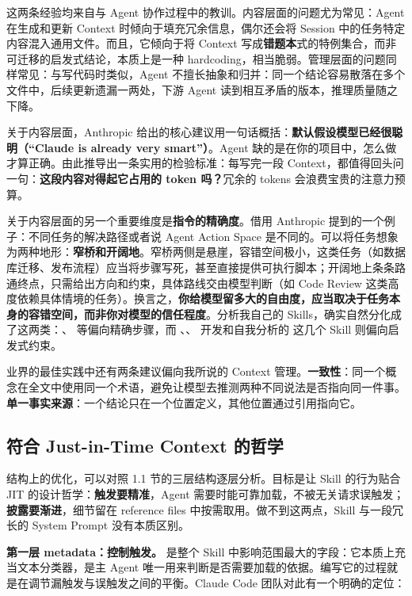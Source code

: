 这两条经验均来自与 Agent 协作过程中的教训。内容层面的问题尤为常见：Agent 在生成和更新 Context 时倾向于填充冗余信息，偶尔还会将 Session 中的任务特定内容混入通用文件。而且，它倾向于将 Context 写成\textbf{错题本}式的特例集合，而非可迁移的启发式结论，本质上是一种 hardcoding，相当脆弱。管理层面的问题同样常见：与写代码时类似，Agent 不擅长抽象和归并：同一个结论容易散落在多个文件中，后续更新遗漏一两处，下游 Agent 读到相互矛盾的版本，推理质量随之下降。

关于内容层面，Anthropic 给出的核心建议用一句话概括：\textbf{默认假设模型已经很聪明（“Claude is already very smart”）}。Agent 缺的是在你的项目中，怎么做才算正确。由此推导出一条实用的检验标准：每写完一段 Context，都值得回头问一句：\textbf{这段内容对得起它占用的 token 吗？}冗余的 tokens 会浪费宝贵的注意力预算。

关于内容层面的另一个重要维度是\textbf{指令的精确度}。借用 Anthropic 提到的一个例子：不同任务的解决路径或者说 Agent Action Space 是不同的。可以将任务想象为两种地形：\textbf{窄桥和开阔地}。窄桥两侧是悬崖，容错空间极小，这类任务（如数据库迁移、发布流程）应当将步骤写死，甚至直接提供可执行脚本；开阔地上条条路通终点，只需给出方向和约束，具体路线交由模型判断（如 Code Review 这类高度依赖具体情境的任务）。换言之，\textbf{你给模型留多大的自由度，应当取决于任务本身的容错空间，而非你对模型的信任程度}。分析我自己的 Skills，确实自然分化成了这两类：、 等偏向精确步骤，而 、、 开发和自我分析的  这几个 Skill 则偏向启发式约束。

业界的最佳实践中还有两条建议偏向我所说的 Context 管理。\textbf{一致性}：同一个概念在全文中使用同一个术语，避免让模型去推测两种不同说法是否指向同一件事。\textbf{单一事实来源}：一个结论只在一个位置定义，其他位置通过引用指向它。

\subsection{符合 Just-in-Time Context 的哲学}

结构上的优化，可以对照 1.1 节的三层结构逐层分析。目标是让 Skill 的行为贴合 JIT 的设计哲学：\textbf{触发要精准}，Agent 需要时能可靠加载，不被无关请求误触发；\textbf{披露要渐进}，细节留在 reference files 中按需取用。做不到这两点，Skill 与一段冗长的 System Prompt 没有本质区别。

\textbf{第一层 metadata：控制触发。} 是整个 Skill 中影响范围最大的字段：它本质上充当文本分类器，是主 Agent 唯一用来判断是否需要加载的依据。编写它的过程就是在调节漏触发与误触发之间的平衡。Claude Code 团队对此有一个明确的定位：

